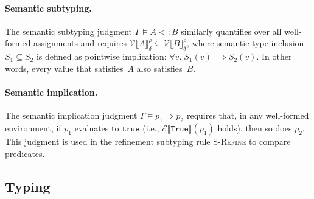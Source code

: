 \documentclass[acmsmall]{acmart}
\begin{document}
\paragraph{Semantic subtyping.}
The semantic subtyping judgment $\Gamma \vDash A <: B$ similarly quantifies over all well-formed assignments and requires $\mathcal{V}\llbracket A \rrbracket_{\delta}^{\rho} \subseteq \mathcal{V}\llbracket B \rrbracket_{\delta}^{\rho}$, where semantic type inclusion $S_1 \subseteq S_2$ is defined as pointwise implication: $\forall v.\; S_1(v) \implies S_2(v)$. In other words, every value that satisfies~$A$ also satisfies~$B$.

\paragraph{Semantic implication.}
The semantic implication judgment $\Gamma \vDash p_1 \Rightarrow p_2$ requires that, in any well-formed environment, if $p_1$ evaluates to $\texttt{true}$ (i.e., $\mathcal{E}\llbracket \texttt{True} \rrbracket(p_1)$ holds), then so does $p_2$. This judgment is used in the refinement subtyping rule \textsc{S-Refine} to compare predicates.



\subsection{Typing}\label{sec:typing}
\end{document}

